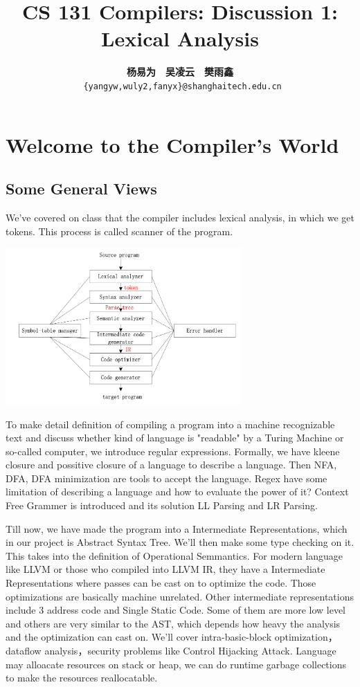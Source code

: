 \documentclass[a4paper]{article}
\title{CS 131 Compilers: Discussion 1: Lexical Analysis}
\author{\textbf{杨易为}~~\textbf{吴凌云}~~\textbf{樊雨鑫} \\ \texttt{ \{yangyw,wuly2,fanyx\}@shanghaitech.edu.cn}}
\theoremstyle{definition}
\begin{document}
\maketitle
\section{Welcome to the Compiler's World}
\subsection{Some General Views}

We've covered on class that the compiler includes lexical analysis, in which we get tokens. This process is called scanner of the program.
\begin{center}
\includegraphics[height=6cm]{img/01-phases.png}
\end{center}

To make detail definition of compiling a program into a machine recognizable text and discuss whether kind of language is "readable" by a Turing Machine or so-called computer, we introduce regular expressions. Formally, we have kleene closure and possitive closure of a language to describe a language. Then NFA, DFA, DFA minimization are tools to accept the language. Regex have some limitation of describing a language and how to evaluate the power of it? Context Free Grammer is introduced and its solution LL Parsing and LR Parsing.

Till now, we have made the program into a Intermediate Representations, which in our project is Abstract Syntax Tree. We'll then make some type checking on it. This takes into the definition of Operational Semmantics. For modern language like LLVM or those who compiled into LLVM IR, they have a Intermediate Representations where passes can be cast on to optimize the code. Those optimizations are basically machine unrelated. Other intermediate representations include 3 address code and Single Static Code. Some of them are more low level and others are very similar to the AST, which depends how heavy the analysis and the optimization can cast on. We'll cover intra-basic-block optimization，dataflow analysis，security problems like Control Hijacking Attack. Language may alloacate resources on stack or heap, we can do runtime garbage collections to make the resources reallocatable.
\end{document}
